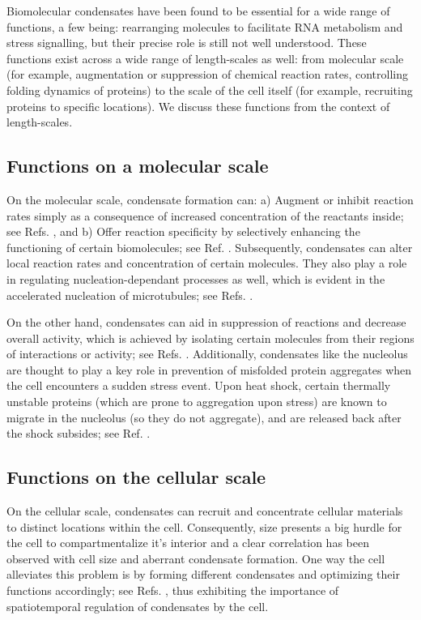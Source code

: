 Biomolecular condensates have been found to be essential for a wide range of functions, a few being: rearranging molecules to facilitate RNA metabolism and stress signalling, but their precise role is still not well understood.
These functions exist across a wide range of length-scales as well: from molecular scale (for example, augmentation or suppression of chemical reaction rates, controlling folding dynamics of proteins) to the scale of the cell itself (for example, recruiting proteins to specific locations).
We discuss these functions from the context of length-scales.

\subsection{Functions on a molecular scale}

On the molecular scale, condensate formation can: a) Augment or inhibit reaction rates simply as a consequence of increased concentration of the reactants inside; see Refs. \cite{ANDERSSON2008275,Mingjian2018}, and b) Offer reaction specificity by selectively enhancing the functioning of certain biomolecules; see Ref. \cite{Peeples2020}.
Subsequently, condensates can alter local reaction rates and concentration of certain molecules.
They also play a role in regulating nucleation-dependant processes as well, which is evident in the accelerated nucleation of microtubules; see Refs. \cite{Huang2017,King2020}.

On the other hand, condensates can aid in suppression of reactions and decrease overall activity, which is achieved by isolating certain molecules from their regions of interactions or activity; see Refs. \cite{Hirose2014,POWERS2019177}.
Additionally, condensates like the nucleolus are thought to play a key role in prevention of misfolded protein aggregates when the cell encounters a sudden stress event.
Upon heat shock, certain thermally unstable proteins (which are prone to aggregation upon stress) are known to migrate in the nucleolus (so they do not aggregate), and are released back after the shock subsides; see Ref. \cite{Frottin2019}.

\subsection{Functions on the cellular scale}

On the cellular scale, condensates can recruit and concentrate cellular materials to distinct locations within the cell.
Consequently, size presents a big hurdle for the cell to compartmentalize it's interior and a clear correlation has been observed with cell size and aberrant condensate formation.
One way the cell alleviates this problem is by forming different condensates and optimizing their functions accordingly; see Refs. \cite{LEE2013572,Lee2015}, thus exhibiting the importance of spatiotemporal regulation of condensates by the cell.

